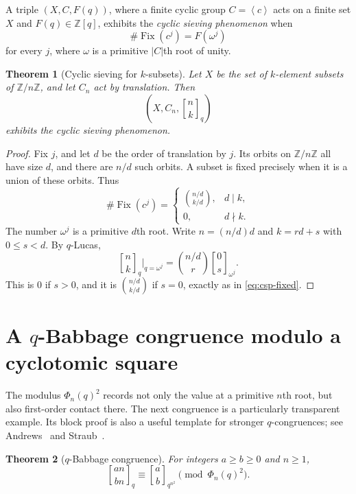 \documentclass[11pt,oneside,openany]{book}
\newtheorem{theorem}{Theorem}[chapter]
\theoremstyle{definition}
\theoremstyle{remark}
\newcommand{\qbinom}[2]{\genfrac{[}{]}{0pt}{}{#1}{#2}_{q}}
\newcommand{\Qbinom}[3]{\genfrac{[}{]}{0pt}{}{#1}{#2}_{#3}}
\newcommand{\Z}{\mathbb Z}
\newcommand{\abs}[1]{\lvert #1\rvert}
\newcommand{\angles}[1]{\left\langle#1\right\rangle}
\begin{document}
A triple $(X,C,F(q))$, where a finite cyclic group $C=\angles c$ acts on a finite set $X$ and $F(q)\in\Z[q]$, exhibits the \emph{cyclic sieving phenomenon} when
\[
 \#\operatorname{Fix}(c^j)=F(\omega^j)
\]
for every $j$, where $\omega$ is a primitive $\abs C$th root of unity.

\begin{theorem}[Cyclic sieving for $k$-subsets]\label{thm:csp-subsets}
Let $X$ be the set of $k$-element subsets of $\Z/n\Z$, and let $C_n$ act by translation.  Then
\[
 \left(X,C_n,\qbinom nk\right)
\]
exhibits the cyclic sieving phenomenon.
\end{theorem}

\begin{proof}
Fix $j$, and let $d$ be the order of translation by $j$.  Its orbits on $\Z/n\Z$ all have size $d$, and there are $n/d$ such orbits.  A subset is fixed precisely when it is a union of these orbits.  Thus
\[
 \#\operatorname{Fix}(c^j)
 =\begin{cases}
 \displaystyle\binom{n/d}{k/d},&d\mid k,\\
 0,&d\nmid k.
 \end{cases}
 \tag{16.8}\label{eq:csp-fixed}
\]
The number $\omega^j$ is a primitive $d$th root.  Write $n=(n/d)d$ and $k=rd+s$ with $0\le s<d$.  By $q$-Lucas,
\[
 \qbinom nk\bigg|_{q=\omega^j}
 =\binom{n/d}{r}\Qbinom 0s{\omega^j}.
\]
This is $0$ if $s>0$, and it is $\binom{n/d}{k/d}$ if $s=0$, exactly as in \eqref{eq:csp-fixed}.
\end{proof}

\section{A \texorpdfstring{$q$}{q}-Babbage congruence modulo a cyclotomic square}

The modulus $\Phi_n(q)^2$ records not only the value at a primitive $n$th root, but also first-order contact there.  The next congruence is a particularly transparent example.  Its block proof is also a useful template for stronger $q$-congruences; see Andrews~\cite{Andrews1999Congruences} and Straub~\cite{Straub2011Ljunggren}.

\begin{theorem}[$q$-Babbage congruence]\label{thm:q-babbage}
For integers $a\ge b\ge0$ and $n\ge1$,
\[
 \Qbinom{an}{bn}{q}
 \equiv
 \Qbinom ab{q^{n^2}}
 \pmod{\Phi_n(q)^2}.
 \tag{16.9}\label{eq:q-babbage}
\]
\end{theorem}
\end{document}
